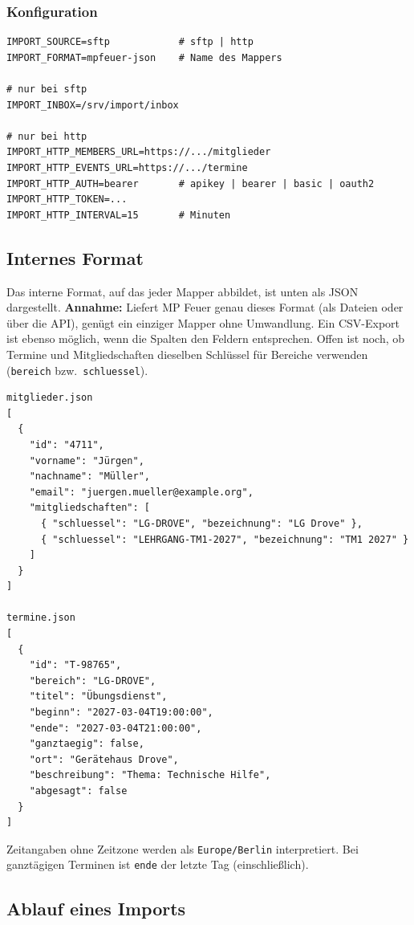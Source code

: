 \documentclass[a4paper,fontsize=10pt]{scrartcl}
\newcommand{\code}[1]{\texttt{#1}}
\begin{document}
\subsubsection*{Konfiguration}

\begin{lstlisting}
IMPORT_SOURCE=sftp            # sftp | http
IMPORT_FORMAT=mpfeuer-json    # Name des Mappers

# nur bei sftp
IMPORT_INBOX=/srv/import/inbox

# nur bei http
IMPORT_HTTP_MEMBERS_URL=https://.../mitglieder
IMPORT_HTTP_EVENTS_URL=https://.../termine
IMPORT_HTTP_AUTH=bearer       # apikey | bearer | basic | oauth2
IMPORT_HTTP_TOKEN=...
IMPORT_HTTP_INTERVAL=15       # Minuten
\end{lstlisting}

\subsection{Internes Format}

Das interne Format, auf das jeder Mapper abbildet, ist unten als JSON
dargestellt. \textbf{Annahme:} Liefert MP Feuer genau dieses Format (als
Dateien oder über die API), genügt ein einziger Mapper ohne Umwandlung. Ein
CSV-Export ist ebenso möglich, wenn die Spalten den Feldern entsprechen.
Offen ist noch, ob Termine und Mitgliedschaften dieselben Schlüssel für
Bereiche verwenden (\code{bereich} bzw.\ \code{schluessel}).

\begin{lstlisting}
mitglieder.json
[
  {
    "id": "4711",
    "vorname": "Jürgen",
    "nachname": "Müller",
    "email": "juergen.mueller@example.org",
    "mitgliedschaften": [
      { "schluessel": "LG-DROVE", "bezeichnung": "LG Drove" },
      { "schluessel": "LEHRGANG-TM1-2027", "bezeichnung": "TM1 2027" }
    ]
  }
]

termine.json
[
  {
    "id": "T-98765",
    "bereich": "LG-DROVE",
    "titel": "Übungsdienst",
    "beginn": "2027-03-04T19:00:00",
    "ende": "2027-03-04T21:00:00",
    "ganztaegig": false,
    "ort": "Gerätehaus Drove",
    "beschreibung": "Thema: Technische Hilfe",
    "abgesagt": false
  }
]
\end{lstlisting}

Zeitangaben ohne Zeitzone werden als \code{Europe/Berlin} interpretiert. Bei
ganztägigen Terminen ist \code{ende} der letzte Tag (einschließlich).

\subsection{Ablauf eines Imports}\label{sec:importablauf}
\end{document}
